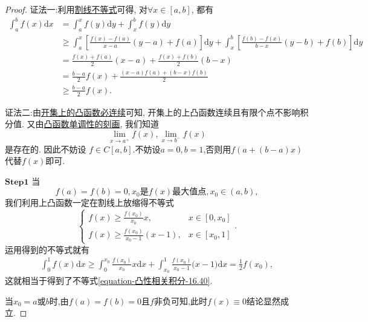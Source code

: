 \documentclass[../../main.tex]{subfiles}%
\begin{document}
\begin{proof}

{\color{blue}证法一:}利用\hyperref[proposition:下凸函数的基本性质]{割线不等式}可得, 对$\forall x\in [a,b]$, 都有
\begin{align*}
\int_a^b{f\left( x \right) \mathrm{d}x}&= \int_a^x{f\left( y \right) \mathrm{d}y}+\int_x^b{f\left( y \right) \mathrm{d}y}
\\
&\geqslant \int_a^x{\left[ \frac{f\left( x \right) -f\left( a \right)}{x-a}\left( y-a \right) +f\left( a \right) \right] \mathrm{d}y}+\int_x^b{\left[ \frac{f\left( b \right) -f\left( x \right)}{b-x}\left( y-b \right) +f\left( b \right) \right] \mathrm{d}y}
\\
&=\frac{f\left( x \right) +f\left( a \right)}{2}\left( x-a \right) +\frac{f\left( x \right) +f\left( b \right)}{2}\left( b-x \right) 
\\
&=\frac{b-a}{2}f\left( x \right) +\frac{\left( x-a \right) f\left( a \right) +\left( b-x \right) f\left( b \right)}{2}
\\
&\geqslant \frac{b-a}{2}f\left( x \right) .
\end{align*}

{\color{blue}证法二:}由\hyperref[corollary:开集上的下凸函数必连续]{开集上的凸函数必连续}可知, 开集上的上凸函数连续且有限个点不影响积分值. 又由\hyperref[proposition:下凸函数的单调性刻画]{凸函数单调性的刻画}, 我们知道
\[\lim_{x \to a^+}f(x), \lim_{x \to b^-}f(x)\]
是存在的. 因此不妨设 $f \in C[a,b]$.不妨设$a=0,b=1$,否则用$f(a+(b-a)x)$代替$f(x)$即可.

$\mathbf{Step}\mathbf{1}$ 当
\[f(a) = f(b) = 0, x_0\text{是}f(x)\text{最大值点}, x_0 \in (a,b),\]
我们利用上凸函数一定在割线上放缩得不等式
\[
\begin{cases}
f(x) \geqslant   \frac{f(x_0) }{x_0 }x, &x \in [0,x_0]\\
f(x) \geqslant \frac{f(x_0) }{x_0 - 1}(x - 1), &x \in [x_0,1]
\end{cases}.
\]
运用得到的不等式就有
\begin{align*}
\int_0^1{f(x)\mathrm{d}x\geqslant \int_0^{x_0}{\frac{f(x_0)}{x_0}x}}\mathrm{d}x+\int_{x_0}^1{\frac{f(x_0)}{x_0-1}(x}-1)\mathrm{d}x=\frac{1}{2}f(x_0),
\end{align*}
这就相当于得到了不等式\eqref{equation-凸性相关积分-16.40}.

当$x_0=a\text{或}b$时,由$f(a)=f(b)=0$且$f$非负可知,此时$f(x)\equiv 0$结论显然成立.


\end{proof}
\end{document}
